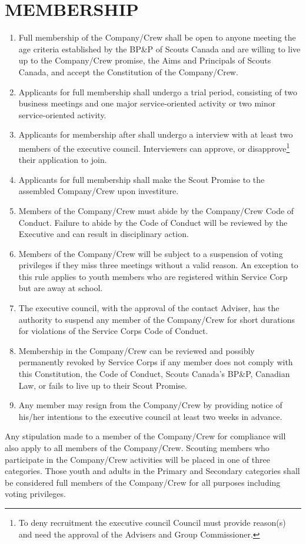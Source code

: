 \documentclass{Service_Corps_Document}
\begin{document}
\section{MEMBERSHIP}
\begin{enumerate}
	\item Full membership of the Company/Crew shall be open to anyone meeting the age criteria established by the BP\&P of Scouts Canada and are willing to live up to the Company/Crew promise, the Aims and Principals of Scouts Canada, and accept the Constitution of the Company/Crew. 
	\item Applicants for full membership shall undergo a trial period, consisting of two business meetings and one major service-oriented activity or two minor service-oriented activity.
	\item Applicants for membership after shall undergo a interview with at least two members of the executive council. Interviewers can approve, or disapprove\footnote{To deny recruitment the executive council Council must provide reason(s) and need the approval of the Advisers and Group Commissioner.} their application to join.
	\item Applicants for full membership shall make the Scout Promise to the assembled Company/Crew upon investiture. 
	\item Members of the Company/Crew must abide by the Company/Crew Code of Conduct. Failure to abide by the Code of Conduct will be reviewed by the Executive and can result in disciplinary action. 
	\item Members of the Company/Crew will be subject to a suspension of voting privileges if they miss three meetings without a valid reason. An exception to this rule applies to youth members who are registered within Service Corp but are away at school.
	\item The executive council, with the approval of the contact Adviser, has the authority to suspend any member of the Company/Crew for short durations for violations of the Service Corps Code of Conduct. 
	\item Membership in the Company/Crew can be reviewed and possibly permanently revoked by Service Corps if any member does not comply with this Constitution, the Code of Conduct, Scouts Canada's BP\&P, Canadian Law, or fails to live up to their Scout Promise.
	\item Any member may resign from the Company/Crew by providing notice of his/her intentions to the executive council at least two weeks in advance.
\end{enumerate}
Any stipulation made to a member of the Company/Crew for compliance will also apply to all members of the Company/Crew. 
Scouting members who participate in the Company/Crew activities will be placed in one of three categories. Those youth and adults in the Primary and Secondary categories shall be considered full members of the Company/Crew for all purposes including voting privileges. 
\end{document}
